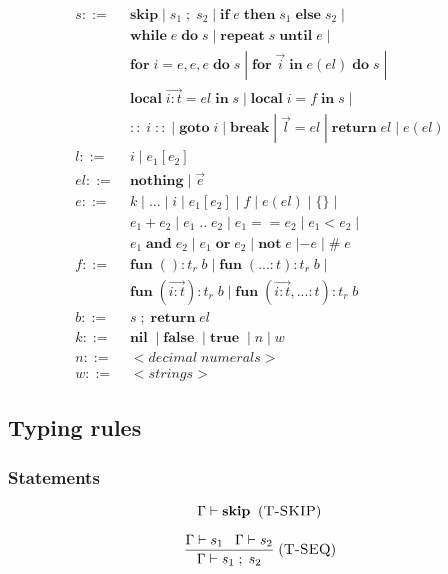 \documentclass[12pt]{article}
\newcommand{\mylabel}[1]{\; (\textsc{#1})}
\newcommand{\pipe}{|\;}
\newcommand{\kw}[1]{\mathbf{#1} \;}
\newcommand{\env}{\Gamma}
\begin{document}
\begin{align*}
s ::= \; & \kw{skip} \pipe s_{1} \;;\; s_{2} \; \pipe
\kw{if} e \; \kw{then} s_{1} \; \kw{else} s_{2} \; \pipe\\
& \kw{while} e \; \kw{do} s \; \pipe
\kw{repeat} s \; \kw{until} e \; \pipe\\
& \kw{for} i=e,e,e \; \kw{do} s \; \pipe
\kw{for} \vec{i} \; \kw{in} e(el) \; \kw{do} s \; \pipe\\
& \kw{local} \overrightarrow{i:t} = el \; \kw{in} s \; \pipe
\kw{local} i = f \; \kw{in} s \; \pipe\\
& \kw{::} i \; \kw{::} \pipe \kw{goto} i \; \pipe \kw{break} \pipe
\vec{l} = el \; \pipe \kw{return} el \; \pipe e(el)\\
l ::= \; & i \; \pipe e_{1}[e_{2}]\\
el ::= \; & \kw{nothing} \pipe \vec{e}\\
e ::= \; & k \; \pipe {...} \; \pipe i \; \pipe e_{1}[e_{2}] \; \pipe
f \; \pipe e(el) \; \pipe \{\} \; \pipe\\
& e_{1} + e_{2} \; \pipe e_{1} \; {..} \; e_{2} \; \pipe
e_{1} == e_{2} \; \pipe e_{1} < e_{2} \; \pipe\\
& e_{1} \; \kw{and} e_{2} \; \pipe e_{1} \; \kw{or} e_{2} \; \pipe
\kw{not} e \; | - e \; \pipe \# \; e\\
f ::= \; & \kw{fun} ():t_{r} \; b \; \pipe
\kw{fun} ({...}:t):t_{r} \; b \; \pipe\\
& \kw{fun} (\overrightarrow{i:t}):t_{r} \; b \; \pipe
\kw{fun} (\overrightarrow{i:t},{...}:t):t_{r} \; b\\
b ::= \; & s \;;\; \kw{return} el\\
k ::= \; & \kw{nil} \; \pipe \kw{false} \; \pipe \kw{true} \; \pipe
n \; \pipe w\\
n ::= \; & {<}decimal\;numerals{>}\\
w ::= \; & {<}strings{>}
\end{align*}

\subsection{Typing rules}

\subsubsection{Statements}

\[
\env \vdash \kw{skip}
\mylabel{T-SKIP}
\]

\[
\frac{\env \vdash s_{1} \;\;\;
      \env \vdash s_{2}}
     {\env \vdash s_{1} \;;\; s_{2}}
\mylabel{T-SEQ}
\]
\end{document}
